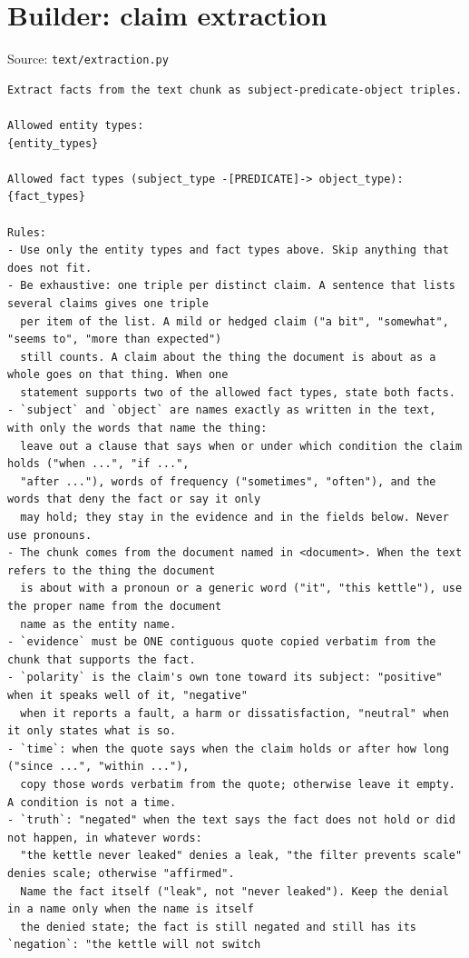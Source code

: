 \section*{Builder: claim extraction}
\noindent Source: \texttt{text/extraction.py}
\begin{lstlisting}
Extract facts from the text chunk as subject-predicate-object triples.

Allowed entity types:
{entity_types}

Allowed fact types (subject_type -[PREDICATE]-> object_type):
{fact_types}

Rules:
- Use only the entity types and fact types above. Skip anything that does not fit.
- Be exhaustive: one triple per distinct claim. A sentence that lists several claims gives one triple
  per item of the list. A mild or hedged claim ("a bit", "somewhat", "seems to", "more than expected")
  still counts. A claim about the thing the document is about as a whole goes on that thing. When one
  statement supports two of the allowed fact types, state both facts.
- `subject` and `object` are names exactly as written in the text, with only the words that name the thing:
  leave out a clause that says when or under which condition the claim holds ("when ...", "if ...",
  "after ..."), words of frequency ("sometimes", "often"), and the words that deny the fact or say it only
  may hold; they stay in the evidence and in the fields below. Never use pronouns.
- The chunk comes from the document named in <document>. When the text refers to the thing the document
  is about with a pronoun or a generic word ("it", "this kettle"), use the proper name from the document
  name as the entity name.
- `evidence` must be ONE contiguous quote copied verbatim from the chunk that supports the fact.
- `polarity` is the claim's own tone toward its subject: "positive" when it speaks well of it, "negative"
  when it reports a fault, a harm or dissatisfaction, "neutral" when it only states what is so.
- `time`: when the quote says when the claim holds or after how long ("since ...", "within ..."),
  copy those words verbatim from the quote; otherwise leave it empty. A condition is not a time.
- `truth`: "negated" when the text says the fact does not hold or did not happen, in whatever words:
  "the kettle never leaked" denies a leak, "the filter prevents scale" denies scale; otherwise "affirmed".
  Name the fact itself ("leak", not "never leaked"). Keep the denial in a name only when the name is itself
  the denied state; the fact is still negated and still has its `negation`: "the kettle will not switch

\end{lstlisting}

